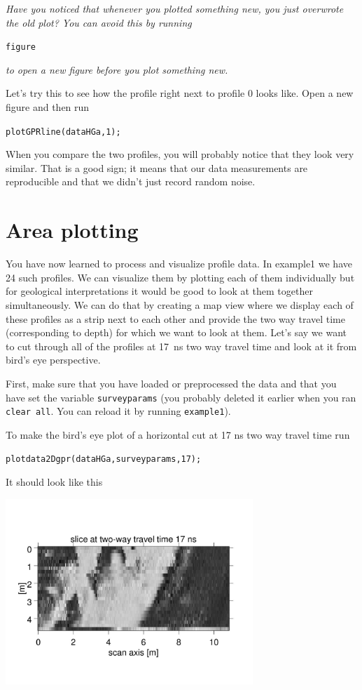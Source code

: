 \documentclass[11pt]{article}
\begin{document}
\emph{Have you noticed that whenever you plotted something new, you
  just overwrote the old plot? You can avoid this by running}

\qquad \verb#figure#

\emph{to open a new figure before you plot something new.}

Let's try this to see how the profile right next to profile 0 looks
like. Open a new figure and then run

\qquad \verb#plotGPRline(dataHGa,1);#
   
When you compare the two profiles, you will probably notice that they look very
similar. That is a good sign; it means that our data measurements are
reproducible and that we didn't just record random noise.
 

\section{Area plotting}

You have now learned to process and visualize profile data. In
example1 we have 24 such profiles. We can visualize them by plotting
each of them individually but for geological interpretations it would
be good to look at them together simultaneously. We can do that by
creating a map view where we display each of these profiles as a strip
next to each other and provide the two way travel time (corresponding
to depth) for which we want to look at them. Let's say we want to cut
through all of the profiles at \SI{17}{\nano s} two way travel time and look at
it from bird's eye perspective.

First, make sure that you have loaded or preprocessed the data and
that you have set the variable \verb#surveyparams# (you probably
deleted it earlier when you ran \verb#clear all#. You can reload it by
running \verb#example1#).

To make the bird's eye plot of a horizontal cut at 17 ns two way
travel time run

\qquad \verb#plotdata2Dgpr(dataHGa,surveyparams,17);#

It should look like this
\begin{center}
\includegraphics[width=0.7\textwidth, trim = 1cm 3cm 1cm
  3cm,clip]{figures/Area17ns.jpg}
\end{center}
\end{document}
